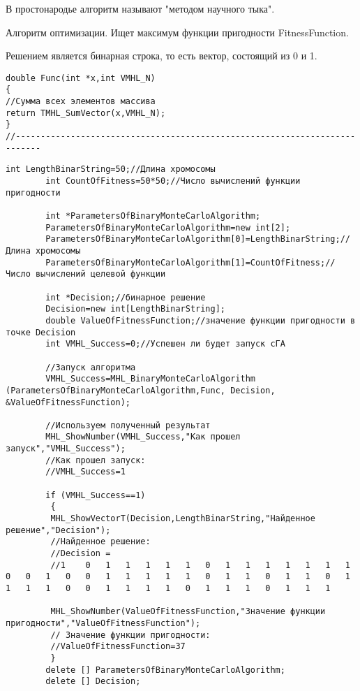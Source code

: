 \documentclass[a4paper,12pt]{article}
\begin{document}
 В простонародье алгоритм называют "методом научного тыка".
 
Алгоритм оптимизации. Ищет максимум функции пригодности FitnessFunction.

Решением является бинарная строка, то есть вектор, состоящий из 0 и 1.

\begin{lstlisting}[caption=Оптимизируемая функция]
double Func(int *x,int VMHL_N)
{
//Сумма всех элементов массива
return TMHL_SumVector(x,VMHL_N);
}
//---------------------------------------------------------------------------
\end{lstlisting}


\begin{lstlisting}[label=code_use_MHL_BinaryMonteCarloAlgorithm,caption=Пример использования]
        int LengthBinarString=50;//Длина хромосомы
        int CountOfFitness=50*50;//Число вычислений функции пригодности

        int *ParametersOfBinaryMonteCarloAlgorithm;
        ParametersOfBinaryMonteCarloAlgorithm=new int[2];
        ParametersOfBinaryMonteCarloAlgorithm[0]=LengthBinarString;//Длина хромосомы
        ParametersOfBinaryMonteCarloAlgorithm[1]=CountOfFitness;//Число вычислений целевой функции

        int *Decision;//бинарное решение
        Decision=new int[LengthBinarString];
        double ValueOfFitnessFunction;//значение функции пригодности в точке Decision
        int VMHL_Success=0;//Успешен ли будет запуск cГА

        //Запуск алгоритма
        VMHL_Success=MHL_BinaryMonteCarloAlgorithm (ParametersOfBinaryMonteCarloAlgorithm,Func, Decision, &ValueOfFitnessFunction);

        //Используем полученный результат
        MHL_ShowNumber(VMHL_Success,"Как прошел запуск","VMHL_Success");
        //Как прошел запуск:
        //VMHL_Success=1

        if (VMHL_Success==1)
         {
         MHL_ShowVectorT(Decision,LengthBinarString,"Найденное решение","Decision");
         //Найденное решение:
         //Decision =
         //1	0	1	1	1	1	1	0	1	1	1	1	1	1	1	0	0	1	0	0	1	1	1	1	1	0	1	1	0	1	1	0	1	1	1	1	0	0	1	1	1	1	0	1	1	1	0	1	1	1

         MHL_ShowNumber(ValueOfFitnessFunction,"Значение функции пригодности","ValueOfFitnessFunction");
         // Значение функции пригодности:
         //ValueOfFitnessFunction=37
         }
        delete [] ParametersOfBinaryMonteCarloAlgorithm;
        delete [] Decision;
\end{lstlisting}
\end{document}
